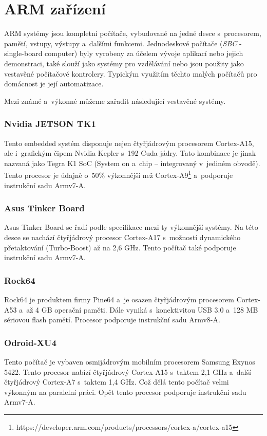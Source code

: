 \section{ARM zařízení}
ARM systémy jsou kompletní počítače, vybudované na jedné desce s~procesorem, pamětí, vstupy, výstupy a~dalšími funkcemi. Jednodeskové počítače (\textit{SBC} - single-board computer) byly vyrobeny za účelem vývoje aplikací nebo jejich demonstraci, také slouží jako systémy pro vzdělávání nebo jsou použity jako vestavěné počítačové kontrolery. Typickým využitím těchto malých počítačů pro domácnost je její automatizace. 

Mezi známé a~výkonné můžeme zařadit následující vestavěné systémy.

\subsubsection*{Nvidia JETSON TK1}
Tento embedded systém disponuje nejen čtyřjádrovým procesorem Cortex-A15, ale i~grafickým čipem Nvidia Kepler s~192 Cuda jádry. Tato kombinace je jinak nazvaná jako Tegra K1 SoC (System on a~chip – integrovaný v~jediném obvodě). Tento procesor je údajně o~50\% výkonnější než Cortex-A9\footnote{https://developer.arm.com/products/processors/cortex-a/cortex-a15} a~podporuje instrukční sadu Armv7-A.

\subsubsection*{Asus Tinker Board}
Asus Tinker Board se řadí podle specifikace mezi ty výkonnější systémy. Na této desce se nachází čtyřjádrový procesor Cortex-A17 s~možností dynamického přetaktování (Turbo-Boost) až na 2,6 GHz. Tento počítač také podporuje instrukční sadu Armv7-A.  

\subsubsection*{Rock64}
Rock64 je produktem firmy Pine64 a~je osazen čtyřjádrovým procesorem Cortex-A53 a~až 4 GB operační paměti. Dále vyniká s~konektivitou USB 3.0 a~128 MB sériovou flash pamětí. Procesor podporuje instrukční sadu Armv8-A.

\subsubsection*{Odroid-XU4}
Tento počítač je vybaven osmijádrovým mobilním procesorem Samsung Exynos 5422. Tento procesor nabízí čtyřjádrový Cortex-A15 s~taktem 2,1 GHz a~další čtyřjádrový Cortex-A7 s~taktem 1,4 GHz. Což dělá tento počítač velmi výkonným na paralelní práci. Opět tento procesor podporuje instrukční sadu Armv7-A.

